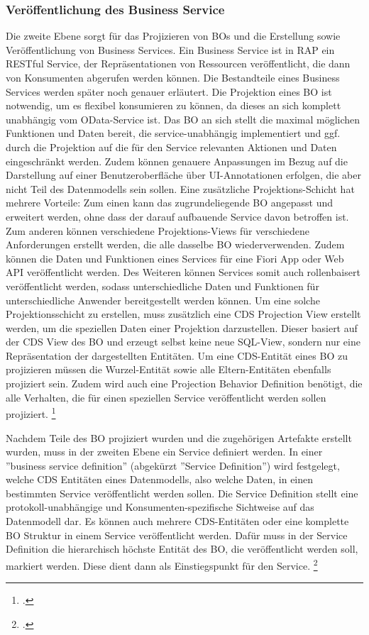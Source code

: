 \subsubsection{Veröffentlichung des Business Service}

Die zweite Ebene sorgt für das Projizieren von BOs und die Erstellung sowie Veröffentlichung von Business Services. Ein Business Service ist in RAP ein RESTful Service, der Repräsentationen von Ressourcen veröffentlicht, die dann von Konsumenten abgerufen werden können. Die Bestandteile eines Business Services werden später noch genauer erläutert. Die Projektion eines BO ist notwendig, um es flexibel konsumieren zu können, da dieses an sich komplett unabhängig vom OData-Service ist. Das BO an sich stellt die maximal möglichen Funktionen und Daten bereit, die service-unabhängig implementiert und ggf. durch die Projektion auf die für den Service relevanten Aktionen und Daten eingeschränkt werden. Zudem können genauere Anpassungen \zB im Bezug auf die Darstellung auf einer Benutzeroberfläche über UI-Annotationen erfolgen, die aber nicht Teil des Datenmodells sein sollen. Eine zusätzliche Projektions-Schicht hat mehrere Vorteile: Zum einen kann das zugrundeliegende BO angepasst und erweitert werden, ohne dass der darauf aufbauende Service davon betroffen ist. Zum anderen können verschiedene Projektions-Views für verschiedene Anforderungen erstellt werden, die alle dasselbe BO wiederverwenden. Zudem können die Daten und Funktionen eines Services für eine Fiori App oder Web API veröffentlicht werden. Des Weiteren können Services somit auch rollenbaisert veröffentlicht werden, sodass unterschiedliche Daten und Funktionen für unterschiedliche Anwender bereitgestellt werden können. Um eine solche Projektionsschicht zu erstellen, muss zusätzlich eine CDS Projection View erstellt werden, um die speziellen Daten einer Projektion darzustellen. Dieser basiert auf der CDS View des BO und erzeugt selbst keine neue SQL-View, sondern nur eine Repräsentation der dargestellten Entitäten. Um eine CDS-Entität eines BO zu projizieren müssen die Wurzel-Entität sowie alle Eltern-Entitäten ebenfalls projiziert sein. Zudem wird auch eine Projection Behavior Definition benötigt, die alle Verhalten, die für einen speziellen Service veröffentlicht werden sollen projiziert. \footcite[Vgl.][]{sap_rap_2023}

Nachdem Teile des BO projiziert wurden und die zugehörigen Artefakte erstellt wurden, muss in der zweiten Ebene ein Service definiert werden. In einer ''business service definition'' (abgekürzt ''Service Definition'') wird festgelegt, welche CDS Entitäten eines Datenmodells, also welche Daten, in einen bestimmten Service veröffentlicht werden sollen. Die Service Definition stellt eine protokoll-unabhängige und Konsumenten-spezifische Sichtweise auf das Datenmodell dar. Es können auch mehrere CDS-Entitäten oder eine komplette BO Struktur in einem Service veröffentlicht werden. Dafür muss in der Service Definition die hierarchisch höchste Entität des BO, die veröffentlicht werden soll, markiert werden. Diese dient dann als Einstiegspunkt für den Service. \footcite[Vgl.][]{sap_rap_2023}

